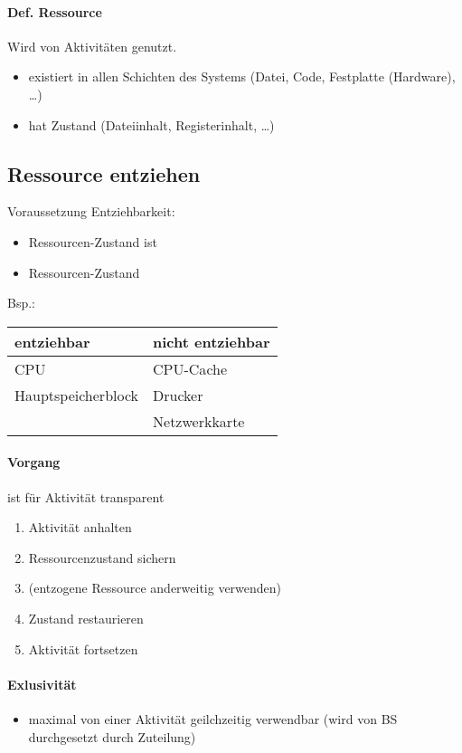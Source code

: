 \paragraph{Def. Ressource}
Wird von Aktivitäten genutzt.
\begin{itemize}
\item existiert in allen Schichten des Systems (Datei, Code, Festplatte (Hardware), …)
\item hat Zustand (Dateiinhalt, Registerinhalt, …)
\end{itemize}
\subsection{Ressource entziehen}
Voraussetzung Entziehbarkeit:
\begin{itemize}
\item Ressourcen-Zustand ist 
\item Ressourcen-Zustand 
\end{itemize}
Bsp.:\\
\begin{tabular}{l | l}
entziehbar & nicht entziehbar\\
\hline
CPU & CPU-Cache\\
Hauptspeicherblock & Drucker\\
& Netzwerkkarte
\end{tabular}
\paragraph{Vorgang} ist für Aktivität transparent
\begin{enumerate}
\item Aktivität anhalten
\item Ressourcenzustand sichern
\item (entzogene Ressource anderweitig verwenden)
\item Zustand restaurieren
\item Aktivität fortsetzen
\end{enumerate}
\paragraph{Exlusivität} 
\begin{itemize}
\item maximal von einer Aktivität geilchzeitig verwendbar (wird von BS durchgesetzt durch Zuteilung)
\end{itemize}
